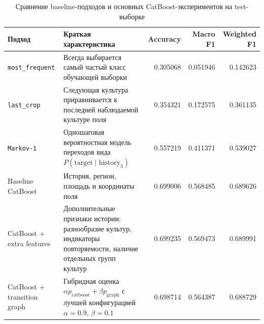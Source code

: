 \begin{table}[htbp]
\centering
\scriptsize
\caption{Сравнение baseline-подходов и основных CatBoost-экспериментов на test-выборке}
\label{tab:practice-model-comparison}
\begin{tabularx}{0.98\textwidth}{L{0.24\textwidth} X r r r}
\toprule
Подход & Краткая характеристика & Accuracy & Macro F1 & Weighted F1 \\
\midrule
\texttt{most\_frequent} & Всегда выбирается самый частый класс обучающей выборки & 0.305068 & 0.051946 & 0.142623 \\
\texttt{last\_crop} & Следующая культура приравнивается к последней наблюдаемой культуре поля & 0.354321 & 0.172575 & 0.361135 \\
\texttt{Markov-1} & Одношаговая вероятностная модель переходов вида $P(\mathrm{target}\mid\mathrm{history}_3)$ & 0.557219 & 0.411371 & 0.539027 \\
Baseline CatBoost & История, регион, площадь и координаты поля & 0.699006 & 0.568485 & 0.689626 \\
CatBoost + extra features & Дополнительные признаки истории: разнообразие культур, индикаторы повторяемости, наличие отдельных групп культур & 0.699235 & 0.569473 & 0.689991 \\
CatBoost + transition graph & Гибридная оценка $\alpha p_{\mathrm{catboost}}+\beta p_{\mathrm{graph}}$ с лучшей конфигурацией $\alpha=0.9$, $\beta=0.1$ & 0.698714 & 0.564387 & 0.688729 \\
\bottomrule
\end{tabularx}
\end{table}
